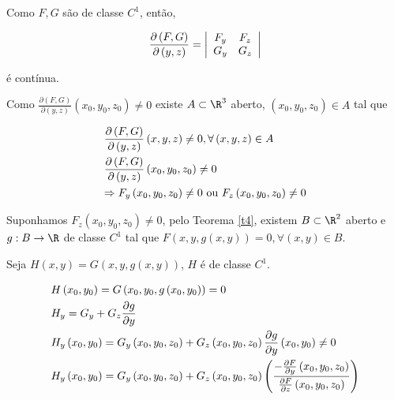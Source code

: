 \documentclass[11pt, oneside, a4paper]{gsm-l}
\begin{document}
\begin{dem}
Como $F,G$ são de classe $C^1$, então,

\[
\frac{{\partial \left( {F,G} \right)}}
{{\partial \left( {y,z} \right)}} = \left| {\begin{array}{*{20}c}
{F_y } & {F_z }  \\
{G_y } & {G_z }  \\

\end{array} } \right|
\]

é contínua.

Como $\frac{{\partial \left( {F,G} \right)}}
{{\partial \left( {y,z} \right)}}\left( {x_0 ,y_0 ,z_0 } \right) \ne 0$ existe $A \subset \R^3$ aberto, $\left( {x_0 ,y_0 ,z_0 } \right) \in A$ tal que

\[
\begin{gathered}
\frac{{\partial \left( {F,G} \right)}}
{{\partial \left( {y,z} \right)}}\left( {x,y,z} \right) \ne 0,\forall \left( {x,y,z} \right) \in A \hfill \\
\frac{{\partial \left( {F,G} \right)}}
{{\partial \left( {y,z} \right)}}\left( {x_0 ,y_0 ,z_0 } \right) \ne 0 \hfill \\
   \Rightarrow F_y \left( {x_0 ,y_0 ,z_0 } \right) \ne 0{\text{ ou }}F_z \left( {x_0 ,y_0 ,z_0 } \right) \ne 0 \hfill \\
\end{gathered}
\]

    Suponhamos $F_z \left( {x_0 ,y_0 ,z_0 } \right) \ne 0$, pelo Teorema \ref{t4}, existem $B \subset \R^2$ aberto e $g:B \to \R$ de classe $C^1$ tal que $F\left( {x,y,g\left( {x,y} \right)} \right) = 0,\forall \left( {x,y} \right) \in B$.

    Seja $H\left( {x,y} \right) = G\left( {x,y,g\left( {x,y} \right)} \right)$, $H$ é de classe $C^1$.

\[
\begin{gathered}
  H\left( {x_0 ,y_0 } \right) = G\left( {x_0 ,y_0 ,g\left( {x_0 ,y_0 } \right)} \right) = 0 \hfill \\
H_y  = G_y  + G_z \frac{{\partial g}}
{{\partial y}} \hfill \\
  H_y \left( {x_0 ,y_0 } \right) = G_y \left( {x_0 ,y_0 ,z_0 } \right) + G_z \left( {x_0 ,y_0 ,z_0 } \right)\frac{{\partial g}}
{{\partial y}}\left( {x_0 ,y_0 } \right) \ne 0 \hfill \\
  H_y \left( {x_0 ,y_0 } \right) = G_y \left( {x_0 ,y_0 ,z_0 } \right) + G_z \left( {x_0 ,y_0 ,z_0 } \right)\left( {\frac{{ - \frac{{\partial F}}
{{\partial y}}\left( {x_0 ,y_0 ,z_0 } \right)}}
{{\frac{{\partial F}}
{{\partial z}}\left( {x_0 ,y_0 ,z_0 } \right)}}} \right) \hfill \\
\end{gathered}
\]


\end{dem}
\end{document}
